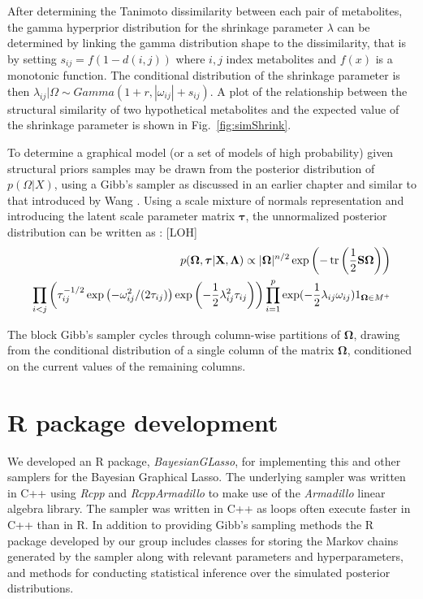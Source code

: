 \begin{DoubleSpace}
After determining the Tanimoto dissimilarity between each pair of metabolites, the gamma hyperprior distribution for the shrinkage parameter $\lambda$ can be determined by linking the gamma distribution shape to the dissimilarity, that is by setting $s_{ij}=f(1-d(i,j))$ where $i,j$ index metabolites and $f(x)$ is a monotonic function. The conditional distribution of the shrinkage parameter is then $\lambda_{ij} |\Omega \sim Gamma(1+r,|\omega_{ij} |+s_{ij} )$. A plot of the relationship between the structural similarity of two hypothetical metabolites and the expected value of the shrinkage parameter is shown in  Fig.~\ref{fig:simShrink}. 

To determine a graphical model (or a set of models of high probability) given structural priors samples may be drawn from the posterior distribution of $p(\Omega|X)$, using a Gibb’s sampler as discussed in an earlier chapter and similar to that introduced by Wang \cite{wang2012}. Using a scale mixture of normals representation  \cite{west1987} and introducing the latent scale parameter matrix $\boldsymbol{\tau}$, the unnormalized posterior distribution can be written as \cite{wang2012}: [LOH]
\begin{align}
\begin{split}
	p(\boldsymbol{\Omega}, \boldsymbol{\tau}|\textbf{X}, \boldsymbol{\Lambda}) \propto |\boldsymbol{\Omega}| ^{n/2} \exp \left(-\operatorname{tr} \left(\frac{1}{2}\textbf{S}\boldsymbol{\Omega} \right) \right)\\ \prod_{i<j} \left(\tau_{ij}^{-1/2} \exp \left(-\omega_{ij}^2 / (2\tau_{ij}) \right) \exp \left(-\frac{1}{2} \lambda_{ij}^2 \tau_{ij}\right)\right)  \prod_{i=1}^{p} \exp(-\frac{1}{2} \lambda_{ij} \omega_{ij}) 1_{\boldsymbol{\Omega}\in M^+}
\end{split}
\end{align}

The block Gibb’s sampler cycles through column-wise partitions of $\boldsymbol{\Omega}$, drawing from the conditional distribution of a single column of the matrix $\boldsymbol{\Omega}$, conditioned on the current values of the remaining columns.

\section{R package development} 
 We developed an R package, \emph{BayesianGLasso}, for implementing this and other samplers for the Bayesian Graphical Lasso. The underlying sampler was written in C++ using \emph{Rcpp} \cite{eddelbuettel2011,eddelbuettel2013} and \emph{RcppArmadillo} \cite{eddelbuettel2014} to make use of the \emph{Armadillo} \cite{sanderson2016} linear algebra library. The sampler was written in C++ as loops often execute faster in C++ than in R. In addition to providing Gibb’s sampling methods the R package developed by our group includes classes for storing the Markov chains generated by the sampler along with relevant parameters and hyperparameters, and methods for conducting statistical inference over the simulated posterior distributions.
 

\end{DoubleSpace}
